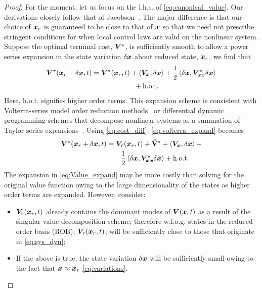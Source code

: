 \begin{proof}
	For the moment, let us focus on the l.h.s. of \eqref{eq:canonical_value}. Our derivations  closely follow that of Jacobson~\cite{Jacobson1968new}. The major difference is that our choice of $\bm{x}_r$ is guaranteed to be close to that of $\bm{x}$ so that we need not prescribe stringent conditions for when local control laws are valid on the nonlinear system.  Suppose the optimal terminal cost, $\bm{V}^\star$, is sufficiently smooth to allow a power series expansion in the state variation $\delta \bm{x}$ about reduced state, $\bm{x}_r$, we find that 
	\begin{align}
		\valuefunc^\star(\state_r + \delta \state, t) &= \valuefunc^\star(\state_r, t) + \left\langle\valuefunc_{\state}, \delta \state \right\rangle + \dfrac{1}{2} \left\langle \delta \state, \valuefunc^\star_{\state\state} \delta\state \right\rangle \nonumber \\
		& \qquad\qquad\qquad  + \text{h.o.t}.
		\label{eq:volterra_expand}
	\end{align}
	Here, h.o.t. signifies higher order terms. This expansion scheme is consistent with  Volterra-series model order reduction methods~\cite{QLMOR} or differential dynamic programming schemes that  decompose nonlinear systems as a summation of Taylor series expansions~\cite{JacobsonMayne}.  Using \eqref{eq:cost_diff},  \eqref{eq:volterra_expand} becomes
	\begin{align}
		\valuefunc^\star(\state_r + \delta \state, t) &= \valuefunc_r(\state_r, t) + \costdiff^\star + \left\langle\valuefunc_{\state}, \delta \state \right\rangle + \nonumber \\
		& \qquad \dfrac{1}{2} \left\langle \delta \state, \valuefunc^\star_{\state\state} \delta\state \right\rangle + \text{h.o.t}.
		\label{eq:Value_expand}
	\end{align}
	The expansion in \eqref{eq:Value_expand} may be more costly than solving for the original value function owing to the large dimensionality of the states as higher order terms are expanded. However, consider:
	\begin{itemize}
		\item $\bm{V}_r(\bm{x}_r, t)$ already contains the dominant modes of $\bm{V}(\bm{x}, t)$ as a result of the singular value decomposition scheme; therefore w.l.o.g. states in the reduced order basis (ROB), $\bm{V}_r(\bm{x}_r, t)$, will be sufficiently close to those that originate in \eqref{eq:sys_dyn};
		\item If the above is true, the state variation  $\delta \bm{x}$ will be sufficiently small owing to the fact that $\bm{x} \approx \bm{x}_r$  \cf \eqref{eq:variations}.

\end{itemize}
\end{proof}

